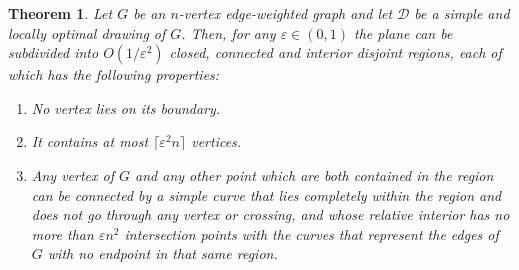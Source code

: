 \documentclass{article}
\newcounter{contSect} \numberwithin{contSect}{section}
\newtheorem{theorem}[contSect]{Theorem}
\begin{document}
\begin{theorem}\label{teo:regions}
    Let $G$ be an $n$-vertex edge-weighted graph and let $\mathcal{D}$ be a simple and locally optimal drawing of $G$. Then, for any $\varepsilon\in(0,1)$ the plane can be subdivided into $O(1/\varepsilon^2)$ closed, connected and interior disjoint regions, each of which has the following properties: 
    \begin{enumerate}[label=(\Roman*)]
        \item No vertex lies on its boundary.
        \item It contains at most $\lceil\varepsilon^2n\rceil$ vertices.
        \item Any vertex of $G$ and any other point which are both contained in the region can be connected by a simple curve that lies completely within the region and does not go through any vertex or crossing, and whose relative interior has no more than $\varepsilon n^2$ intersection points with the curves that represent the edges of $G$ with no endpoint in that same region.
    \end{enumerate} 
\end{theorem}
\end{document}
